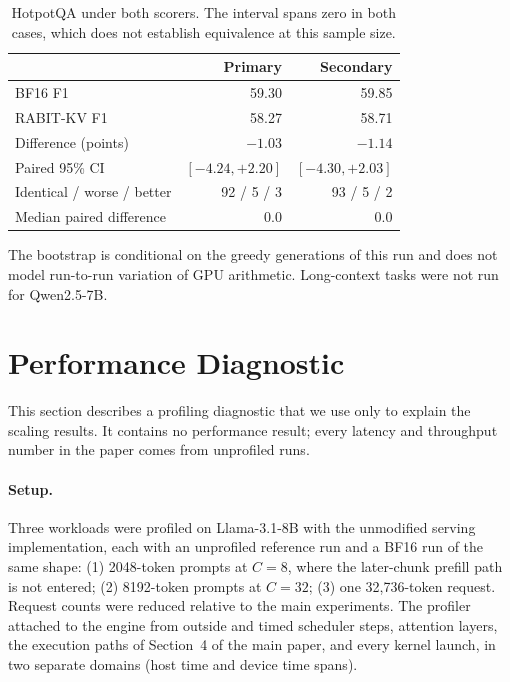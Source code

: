 \documentclass{article}
\begin{document}
\begin{table}[h]
\centering
\small
\setlength{\tabcolsep}{3.5pt}
\begin{tabular}{@{}lrr@{}}
\toprule
 & Primary & Secondary \\
\midrule
BF16 F1 & 59.30 & 59.85 \\
RABIT-KV F1 & 58.27 & 58.71 \\
Difference (points) & $-1.03$ & $-1.14$ \\
Paired 95\% CI & $[-4.24, +2.20]$ & $[-4.30, +2.03]$ \\
Identical / worse / better & 92 / 5 / 3 & 93 / 5 / 2 \\
Median paired difference & 0.0 & 0.0 \\
\bottomrule
\end{tabular}
\caption{HotpotQA under both scorers. The interval spans zero in both cases, which does not establish
equivalence at this sample size.}
\label{tab:app-hotpot}
\end{table}

The bootstrap is conditional on the greedy generations of this run and does not model run-to-run
variation of GPU arithmetic. Long-context tasks were not run for Qwen2.5-7B.

\section{Performance Diagnostic}
\label{app:profile}

This section describes a profiling diagnostic that we use only to explain the scaling results. It
contains no performance result; every latency and throughput number in the paper comes from unprofiled
runs.

\paragraph{Setup.}
Three workloads were profiled on Llama-3.1-8B with the unmodified serving implementation, each with an
unprofiled reference run and a BF16 run of the same shape: (1) 2048-token prompts at $C{=}8$, where the
later-chunk prefill path is not entered; (2) 8192-token prompts at $C{=}32$; (3) one 32,736-token
request. Request counts were reduced relative to the main experiments. The profiler attached to the
engine from outside and timed scheduler steps, attention layers, the execution paths of Section~4 of
the main paper, and every kernel launch, in two separate domains (host time and device time spans).
\end{document}
